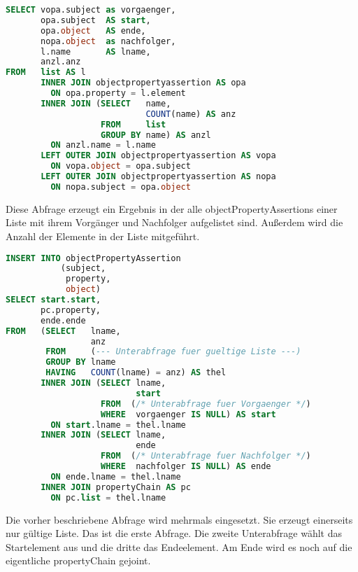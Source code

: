 \begin{lstlisting}[language=SQL]
SELECT vopa.subject as vorgaenger,
       opa.subject  AS start,
       opa.object   AS ende,
       nopa.object  as nachfolger,
       l.name       AS lname,
       anzl.anz
FROM   list AS l
       INNER JOIN objectpropertyassertion AS opa
         ON opa.property = l.element
       INNER JOIN (SELECT   name,
                            COUNT(name) AS anz
                   FROM     list
                   GROUP BY name) AS anzl
         ON anzl.name = l.name
       LEFT OUTER JOIN objectpropertyassertion AS vopa
         ON vopa.object = opa.subject
       LEFT OUTER JOIN objectpropertyassertion AS nopa
         ON nopa.subject = opa.object
\end{lstlisting}

Diese Abfrage erzeugt ein Ergebnis in der alle objectPropertyAssertions einer Liste mit ihrem Vorgänger und Nachfolger aufgelistet sind. Außerdem wird die Anzahl der Elemente in der Liste mitgeführt.

\begin{lstlisting}[language=SQL]
INSERT INTO objectPropertyAssertion
           (subject,
            property,
            object)
SELECT start.start,
       pc.property,
       ende.ende
FROM   (SELECT   lname,
                 anz
        FROM     (--- Unterabfrage fuer gueltige Liste ---)
        GROUP BY lname
        HAVING   COUNT(lname) = anz) AS thel
       INNER JOIN (SELECT lname,
                          start
                   FROM  (/* Unterabfrage fuer Vorgaenger */)
                   WHERE  vorgaenger IS NULL) AS start
         ON start.lname = thel.lname
       INNER JOIN (SELECT lname,
                          ende
                   FROM  (/* Unterabfrage fuer Nachfolger */)
                   WHERE  nachfolger IS NULL) AS ende
         ON ende.lname = thel.lname
       INNER JOIN propertyChain AS pc
         ON pc.list = thel.lname
\end{lstlisting}

Die vorher beschriebene Abfrage wird mehrmals eingesetzt. Sie erzeugt einerseits nur gültige Liste. Das ist die erste Abfrage. Die zweite Unterabfrage wählt das Startelement aus und die dritte das Endeelement. Am Ende wird es noch auf die eigentliche propertyChain gejoint.

